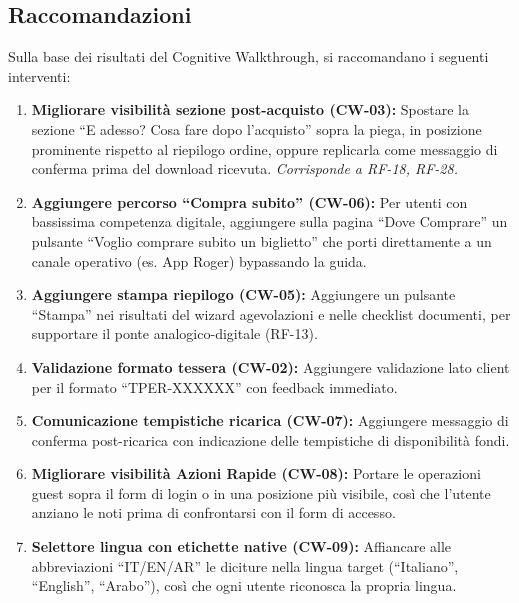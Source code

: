 \documentclass[11pt,a4paper]{article}
\begin{document}
\vspace{0.3cm}

\subsection{Raccomandazioni}

\begin{tcolorbox}[colback=backgroundColor,colframe=accentGreen,arc=2mm]
\small
Sulla base dei risultati del Cognitive Walkthrough, si raccomandano i seguenti interventi:

\begin{enumerate}[leftmargin=*]
  \item \textbf{Migliorare visibilità sezione post-acquisto (CW-03):} Spostare la sezione ``E adesso? Cosa fare dopo l'acquisto'' sopra la piega, in posizione prominente rispetto al riepilogo ordine, oppure replicarla come messaggio di conferma prima del download ricevuta. \textit{Corrisponde a RF-18, RF-28.}

  \item \textbf{Aggiungere percorso ``Compra subito'' (CW-06):} Per utenti con bassissima competenza digitale, aggiungere sulla pagina ``Dove Comprare'' un pulsante ``Voglio comprare subito un biglietto'' che porti direttamente a un canale operativo (es. App Roger) bypassando la guida.

  \item \textbf{Aggiungere stampa riepilogo (CW-05):} Aggiungere un pulsante ``Stampa'' nei risultati del wizard agevolazioni e nelle checklist documenti, per supportare il ponte analogico-digitale (RF-13).

  \item \textbf{Validazione formato tessera (CW-02):} Aggiungere validazione lato client per il formato ``TPER-XXXXXX'' con feedback immediato.

  \item \textbf{Comunicazione tempistiche ricarica (CW-07):} Aggiungere messaggio di conferma post-ricarica con indicazione delle tempistiche di disponibilità fondi.

  \item \textbf{Migliorare visibilità Azioni Rapide (CW-08):} Portare le operazioni guest sopra il form di login o in una posizione più visibile, così che l'utente anziano le noti prima di confrontarsi con il form di accesso.

  \item \textbf{Selettore lingua con etichette native (CW-09):} Affiancare alle abbreviazioni ``IT/EN/AR'' le diciture nella lingua target (``Italiano'', ``English'', ``Arabo''), così che ogni utente riconosca la propria lingua.


\end{enumerate}
\end{tcolorbox}
\end{document}
